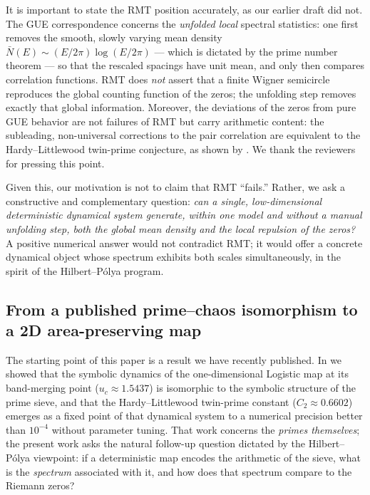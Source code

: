 \documentclass[utf8]{FrontiersinHarvard}
\begin{document}
It is important to state the RMT position accurately, as our earlier draft did not. The GUE correspondence concerns the \emph{unfolded local} spectral statistics: one first removes the smooth, slowly varying mean density $\bar{N}(E)\sim (E/2\pi)\log(E/2\pi)$ \citep{weyl1911} --- which is dictated by the prime number theorem \citep{hadamard1896} --- so that the rescaled spacings have unit mean, and only then compares correlation functions. RMT does \emph{not} assert that a finite Wigner semicircle reproduces the global counting function of the zeros; the unfolding step removes exactly that global information. Moreover, the deviations of the zeros from pure GUE behavior are not failures of RMT but carry arithmetic content: the subleading, non-universal corrections to the pair correlation are equivalent to the Hardy--Littlewood twin-prime conjecture, as shown by \citet{keating2019}. We thank the reviewers for pressing this point.

Given this, our motivation is not to claim that RMT ``fails.'' Rather, we ask a constructive and complementary question: \emph{can a single, low-dimensional deterministic dynamical system generate, within one model and without a manual unfolding step, both the global mean density and the local repulsion of the zeros?} A positive numerical answer would not contradict RMT; it would offer a concrete dynamical object whose spectrum exhibits both scales simultaneously, in the spirit of the Hilbert--P\'olya program.

\subsection{From a published prime--chaos isomorphism to a 2D area-preserving map}

The starting point of this paper is a result we have recently published. In \citet{wang2026} we showed that the symbolic dynamics of the one-dimensional Logistic map at its band-merging point ($u_c \approx 1.5437$) is isomorphic to the symbolic structure of the prime sieve, and that the Hardy--Littlewood twin-prime constant ($C_2 \approx 0.6602$) emerges as a fixed point of that dynamical system to a numerical precision better than $10^{-4}$ without parameter tuning. That work concerns the \emph{primes themselves}; the present work asks the natural follow-up question dictated by the Hilbert--P\'olya viewpoint: if a deterministic map encodes the arithmetic of the sieve, what is the \emph{spectrum} associated with it, and how does that spectrum compare to the Riemann zeros?
\end{document}
